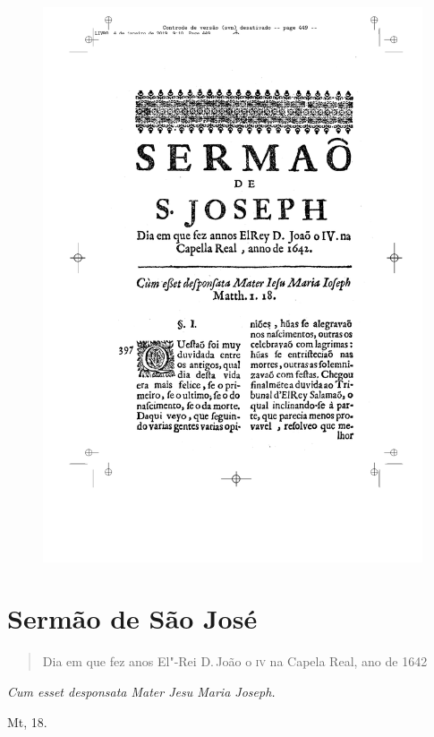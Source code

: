 \pagebreak
\thispagestyle{empty}
\movetoevenpage
\begin{figure}
\includegraphics[width=\textwidth]{./imgs/sjose.pdf}  
\end{figure}


\chapter{Sermão de São José}

\begin{quotation}
\noindent{}Dia em que fez anos El"-Rei D.\,João o \textsc{iv} na Capela Real, ano de 1642
\end{quotation}

\epigraph{\emph{Cum esset desponsata Mater Jesu Maria Joseph.}\footnotemark}{Mt, 18.}

